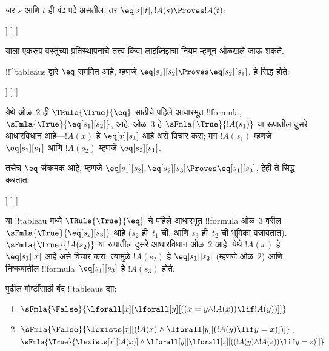 \documentclass[../../../include/open-logic-section]{subfiles}
\begin{document}
\begin{ex}
जर $s$ आणि $t$ ही बंद पदे असतील, तर $\eq[s][t], !A(s)
\Proves !A(t)$:
\begin{oltableau}
  [\sFmla{\False}{\formula{A}(t)}, just = \TAss
    [\sFmla{\True}{\eq[s][t]}, just = \TAss
      [\sFmla{\True}{\formula{A}(s)}, just = \TAss
        [\sFmla{\True}{\formula{A}(t)}, just={\TRule{\True}{\eq}[2, 3]}, close]
      ]
    ]
  ]
\end{oltableau}
याला एकरूप वस्तूंच्या प्रतिस्थापनाचे तत्त्व किंवा लाइब्निझचा नियम म्हणून
ओळखले जाऊ शकते.

!!^{tableau}s द्वारे $\eq$ सममित आहे, म्हणजे $\eq[s_1][s_2]
\Proves \eq[s_2][s_1]$, हे सिद्ध होते:
\begin{oltableau}
  [\sFmla{\False}{\eq[s_2][s_1]}, just = \TAss
    [\sFmla{\True}{\eq[s_1][s_2]}, just = \TAss
      [\sFmla{\True}{\eq[s_1][s_1]}, just = {$\eq$}
        [\sFmla{\True}{\eq[s_2][s_1]}, just = {\TRule{\True}{\eq}[2, 3]}, close]
      ]
    ]
  ]
\end{oltableau}
येथे ओळ~$2$ ही $\TRule{\True}{\eq}$ साठीचे पहिले आधारभूत
!!{formula}, $\sFmla{\True}{\eq[s_1][s_2]}$, आहे. ओळ~$3$ हे
$\sFmla{\True}{!A(s_1)}$ या रूपातील दुसरे आधारविधान आहे---$!A(x)$ हे
$\eq[x][s_1]$ आहे असे विचार करा; मग $!A(s_1)$ म्हणजे
$\eq[s_1][s_1]$ आणि $!A(s_2)$ म्हणजे $\eq[s_2][s_1]$.

तसेच $\eq$ संक्रमक आहे, म्हणजे $\eq[s_1][s_2],
\eq[s_2][s_3] \Proves \eq[s_1][s_3]$, हेही ते सिद्ध करतात:
\begin{oltableau}
  [\sFmla{\False}{\eq[s_1][s_3]}, just = \TAss
    [\sFmla{\True}{\eq[s_1][s_2]}, just = \TAss
      [\sFmla{\True}{\eq[s_2][s_3]}, just = \TAss
        [\sFmla{\True}{\eq[s_1][s_3]}, just = {\TRule{\True}{\eq}[3, 2]}, close]
      ]
    ]
  ]
\end{oltableau}
या !!{tableau} मध्ये $\TRule{\True}{\eq}$ चे पहिले आधारभूत !!{formula}
ओळ~$3$ वरील $\sFmla{\True}{\eq[s_2][s_3]}$ आहे ($s_2$ ही~$t_1$ ची,
आणि $s_3$ ही~$t_2$ ची भूमिका बजावतात). $\sFmla{\True}{!A(s_2)}$
या रूपातील दुसरे आधारविधान ओळ~$2$ आहे. येथे $!A(x)$ हे
$\eq[s_1][x]$ आहे असे विचार करा; त्यामुळे $!A(s_2)$ हे
$\eq[s_1][s_2]$ (म्हणजे ओळ~$2$) आणि निष्कर्षातील
!!{formula}~$\eq[s_1][s_3]$ हे $!A(s_3)$ होते.
\end{ex}

\begin{prob}
पुढील गोष्टींसाठी बंद !!{tableau}s द्या:
\begin{enumerate}
\item $\sFmla{\False}{\lforall[x][\lforall[y][((x = y \land !A(x))
      \lif !A(y))]]}$
\item $\sFmla{\False}{\lexists[x][(!A(x) \land
    \lforall[y][(!A(y) \lif y = x)])]}$,\\
  $\sFmla{\True}{\lexists[x][!A(x)] \land
    \lforall[y][\lforall[z][((!A(y) \land !A(z)) \lif y = z)]]}$
\end{enumerate}
\end{prob}
\end{document}
